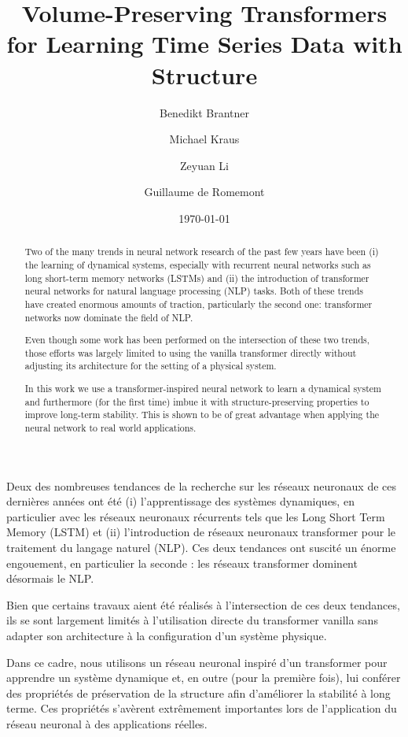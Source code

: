 \documentclass[proc]{edpsmath}
\begin{document}
\title{Volume-Preserving Transformers for Learning Time Series Data with Structure}%
%
\author{Benedikt Brantner}\address{Max-Planck-Institut f\"ur Plasmaphysik, Boltzmannstra\ss{}e 2, 85748 Garching}
\author{Michael Kraus} %
\author{Zeyuan Li}\address{Zentrum Mathematik, Technische Universität München, Boltzmannstra\ss{}e 3, 85748 Garching, Germany}
\author{Guillaume de Romemont} \address{DAAA, ONERA, Université Paris Saclay, F-92322, Châtillon, France}
%
\date{\today}

\begin{abstract} 
    Two of the many trends in neural network research of the past few years have been (i) the learning of dynamical systems, especially with recurrent neural networks such as long short-term memory networks (LSTMs) and (ii) the introduction of transformer neural networks for natural language processing (NLP) tasks. Both of these trends have created enormous amounts of traction, particularly the second one: transformer networks now dominate the field of NLP. 

    Even though some work has been performed on the intersection of these two trends, those efforts was largely limited to using the vanilla transformer directly without adjusting its architecture for the setting of a physical system.

    In this work we use a transformer-inspired neural network to learn a dynamical system and furthermore (for the first time) imbue it with structure-preserving properties to improve long-term stability. This is shown to be of great advantage when applying the neural network to real world applications.
\end{abstract}
%
\begin{resume} 
    Deux des nombreuses tendances de la recherche sur les réseaux neuronaux de ces dernières années ont été (i) l'apprentissage des systèmes dynamiques, en particulier avec les réseaux neuronaux récurrents tels que les Long Short Term Memory (LSTM) et (ii) l'introduction de réseaux neuronaux transformer pour le traitement du langage naturel (NLP). Ces deux tendances ont suscité un énorme engouement, en particulier la seconde : les réseaux transformer dominent désormais le NLP. 

    Bien que certains travaux aient été réalisés à l'intersection de ces deux tendances, ils se sont largement limités à l'utilisation directe du transformer vanilla sans adapter son architecture à la configuration d'un système physique.
    
    Dans ce cadre, nous utilisons un réseau neuronal inspiré d'un transformer pour apprendre un système dynamique et, en outre (pour la première fois), lui conférer des propriétés de préservation de la structure afin d'améliorer la stabilité à long terme. Ces propriétés s'avèrent extrêmement importantes lors de l'application du réseau neuronal à des applications réelles.
    
\end{resume}
\end{document}
